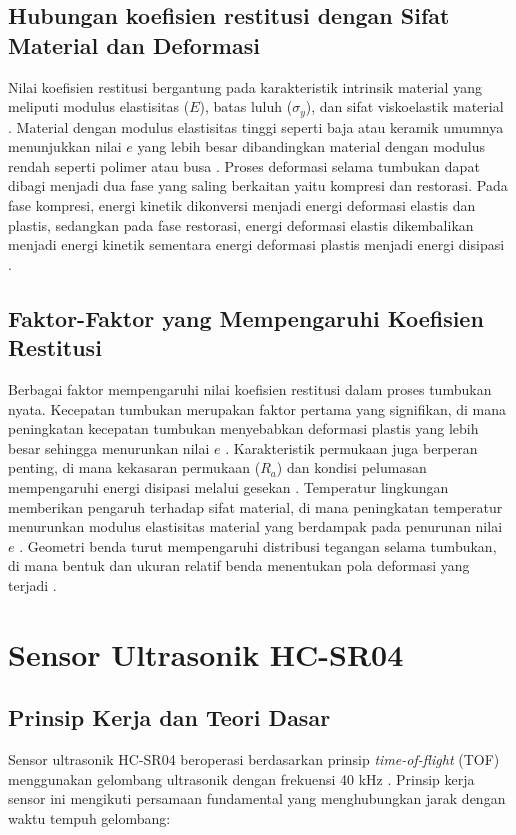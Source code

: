 \subsection{Hubungan koefisien restitusi dengan Sifat Material dan Deformasi}
Nilai koefisien restitusi bergantung pada karakteristik intrinsik material yang meliputi modulus elastisitas ($E$), batas luluh (\(\sigma_y\)), dan sifat viskoelastik material \citep{meyer2020coefficient}. Material dengan modulus elastisitas tinggi seperti baja atau keramik umumnya menunjukkan nilai $e$ yang lebih besar dibandingkan material dengan modulus rendah seperti polimer atau busa \citep{brancazio1981physics}. Proses deformasi selama tumbukan dapat dibagi menjadi dua fase yang saling berkaitan yaitu kompresi dan restorasi. Pada fase kompresi, energi kinetik dikonversi menjadi energi deformasi elastis dan plastis, sedangkan pada fase restorasi, energi deformasi elastis dikembalikan menjadi energi kinetik sementara energi deformasi plastis menjadi energi disipasi \citep{hartono2019analisis}.

\subsection{Faktor-Faktor yang Mempengaruhi Koefisien Restitusi}

Berbagai faktor mempengaruhi nilai koefisien restitusi dalam proses tumbukan nyata. Kecepatan tumbukan merupakan faktor pertama yang signifikan, di mana peningkatan kecepatan tumbukan menyebabkan deformasi plastis yang lebih besar sehingga menurunkan nilai $e$ \citep{smith2018experimental}. Karakteristik permukaan juga berperan penting, di mana kekasaran permukaan ($R_a$) dan kondisi pelumasan mempengaruhi energi disipasi melalui gesekan \citep{penner2002physics}. Temperatur lingkungan memberikan pengaruh terhadap sifat material, di mana peningkatan temperatur menurunkan modulus elastisitas material yang berdampak pada penurunan nilai $e$ \citep{lamb1945hydrodynamics}. Geometri benda turut mempengaruhi distribusi tegangan selama tumbukan, di mana bentuk dan ukuran relatif benda menentukan pola deformasi yang terjadi \citep{stronge2018impact}.

\section{Sensor Ultrasonik HC-SR04}

\subsection{Prinsip Kerja dan Teori Dasar}
Sensor ultrasonik HC-SR04 beroperasi berdasarkan prinsip \textit{time-of-flight} (TOF) menggunakan gelombang ultrasonik dengan frekuensi 40 kHz \citep{fauzi2020pengujian}. Prinsip kerja sensor ini mengikuti persamaan fundamental yang menghubungkan jarak dengan waktu tempuh gelombang:

